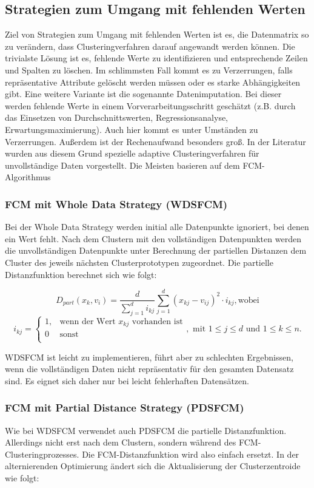 \documentclass[11pt,ceqn]{book}
\begin{document}
\subsection{Strategien zum Umgang mit fehlenden Werten}
Ziel von Strategien zum Umgang mit fehlenden Werten ist es, die Datenmatrix so zu verändern, dass Clusteringverfahren darauf angewandt werden können. Die trivialste Lösung ist es, fehlende Werte zu identifizieren und entsprechende Zeilen und Spalten zu löschen. Im schlimmsten Fall kommt es zu Verzerrungen, falls repräsentative Attribute gelöscht werden müssen oder es starke Abhängigkeiten gibt. Eine weitere Variante ist die sogenannte Datenimputation. Bei dieser werden fehlende Werte in einem Vorverarbeitungsschritt geschätzt (z.B. durch das Einsetzen von Durchschnittswerten, Regressionsanalyse, Erwartungsmaximierung). Auch hier kommt es unter Umständen zu Verzerrungen. Außerdem ist der Rechenaufwand besonders groß. In der Literatur wurden aus diesem Grund spezielle adaptive Clusteringverfahren für unvollständige Daten vorgestellt. Die Meisten basieren auf dem FCM-Algorithmus

\subsubsection{FCM mit Whole Data Strategy (WDSFCM)}
Bei der Whole Data Strategy \cite{wdsfcm} werden initial alle Datenpunkte ignoriert, bei denen ein Wert fehlt. Nach dem Clustern mit den vollständigen Datenpunkten werden die unvollständigen Datenpunkte unter Berechnung der partiellen Distanzen dem Cluster des jeweils nächsten Clusterprototypen zugeordnet. Die partielle Distanzfunktion berechnet sich wie folgt:

$$D_{part}(x_k,v_i) = \frac{d}{\sum\limits_{j=1}^d i_{kj}} \sum\limits_{j=1}^d (x_{kj}-v_{ij})^2 \cdot i_{kj}, \text{wobei}$$
$$i_{kj} = \begin{cases}
1, & \text{wenn der Wert } x_{kj} \text{ vorhanden ist} \\
0 & \textrm{sonst} \\
\end{cases}, \text{ mit } 1\leqslant j\leqslant d \text{ und } 1\leqslant k \leqslant n.$$

WDSFCM ist leicht zu implementieren, führt aber zu schlechten Ergebnissen, wenn die vollständigen Daten nicht repräsentativ für den gesamten Datensatz sind. Es eignet sich daher nur bei leicht fehlerhaften Datensätzen.

\subsubsection{FCM mit Partial Distance Strategy (PDSFCM)}
Wie bei WDSFCM verwendet auch PDSFCM \cite{wdsfcm}\cite{pdsfcm} die partielle Distanzfunktion. Allerdings nicht erst nach dem Clustern, sondern während des FCM-Clusteringprozesses. Die FCM-Distanzfunktion wird also einfach ersetzt. In der alternierenden Optimierung ändert sich die Aktualisierung der Clusterzentroide wie folgt:
\end{document}
